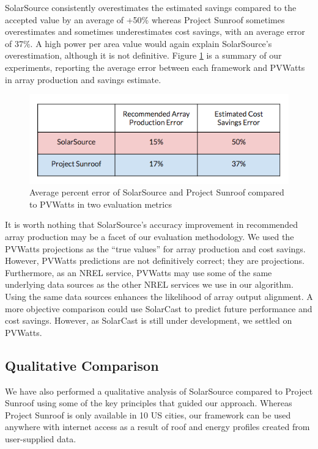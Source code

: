 \documentclass[pageno]{jpaper}
\begin{document}
SolarSource consistently overestimates the estimated savings compared to the accepted value by an average of +50\% whereas Project Sunroof sometimes overestimates and sometimes underestimates cost savings, with an average error of 37\%. A high power per area value would again explain SolarSource's overestimation, although it is not definitive. Figure \ref{fig:comparison-table} is a summary of our experiments, reporting the average error between each framework and PVWatts in array production and savings estimate.

\begin{figure}[h]
\begin{center}
\includegraphics[scale = 0.5] {comp-table}
\caption{Average percent error of SolarSource and Project Sunroof compared to PVWatts in two evaluation metrics}
\label{fig:comparison-table}
\end{center}
\end{figure}

It is worth nothing that SolarSource's accuracy improvement in recommended array production may be a facet of our evaluation methodology. We used the PVWatts projections as the ``true values'' for array production and cost savings. However, PVWatts predictions are not definitively correct; they are projections. Furthermore, as an NREL service, PVWatts may use some of the same underlying data sources as the other NREL services we use in our algorithm. Using the same data sources enhances the likelihood of array output alignment. A more objective comparison could use SolarCast to predict future performance and cost savings. However, as SolarCast is still under development, we settled on PVWatts.

\subsection{Qualitative Comparison}
We have also performed a qualitative analysis of SolarSource compared to Project Sunroof using some of the key principles that guided our approach. Whereas Project Sunroof is only available in 10 US cities, our framework can be used anywhere with internet access as a result of roof and energy profiles created from user-supplied data. 
\end{document}
